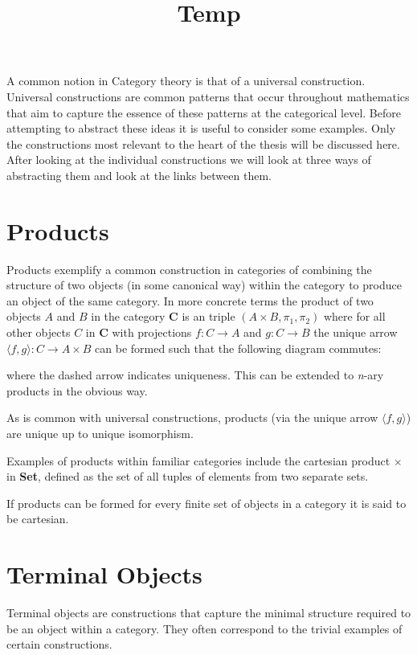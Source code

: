 \documentclass[a4paper,10pt]{article}
\date{}
\title{Temp\vspace{-3.5em}}
\begin{document}
\maketitle
A common notion in Category theory is that of a universal construction.
Universal constructions are common patterns that occur throughout mathematics
that aim to capture the essence of these patterns at the categorical level.
Before attempting to abstract these ideas it is useful to consider some
examples. Only the constructions most relevant to the heart of the thesis will
be discussed here.  After looking at the individual constructions we will look
at three ways of abstracting them and look at the links between them.

\section{Products}
Products exemplify a common construction in categories of combining the
structure of two objects (in some canonical way) within the category to produce
an object of the same category. In more concrete terms the product of two
objects $A$ and $B$ in the category $\textbf{C}$ is an triple $(A \times B,
\pi_{1}, \pi_{2})$ where for all other objects $C$ in $\textbf{C}$ with
projections $f: C \rightarrow A$ and $g: C \rightarrow B$ the unique arrow
$\langle f, g\rangle : C \rightarrow A \times B$ can be formed such that the
following diagram commutes:


where the dashed arrow indicates uniqueness. This can be extended to
\textit{n}-ary products in the obvious way.

As is common with universal constructions, products (via the unique arrow
$\langle f, g \rangle$) are unique up to unique isomorphism.

Examples of products within familiar categories include the cartesian product
$\times$ in \textbf{Set}, defined as the set of all tuples of elements from two
separate sets.

If products can be formed for every finite set of objects in a category it is
said to be cartesian.

\section{Terminal Objects}
Terminal objects are constructions that capture the
minimal structure required to be an object within a category. They often
correspond to the trivial examples of certain constructions.
\end{document}
